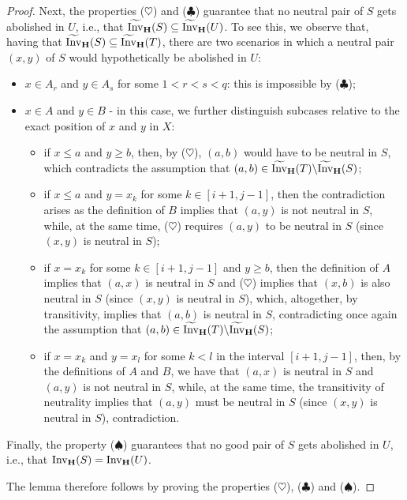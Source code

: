 \documentclass[10pt,a4paper]{amsart}
\newcommand{\Invt}{\widetilde{\mathrm{Inv}}}
\newcommand{\Inv}{{\mathrm{Inv}}}
\begin{document}
\begin{proof}
 Next, the properties ($\heartsuit$) and ($\clubsuit$) guarantee that no neutral pair of $S$ gets abolished in $U$, i.e., that $\Invt_{\bf H}(S)\subseteq\Invt_{\bf H}(U)$. To see this, we observe that, having that $\Invt_{\bf H}(S)\subseteq\Invt_{\bf H}(T)$, there are two scenarios in which a neutral pair $(x,y)$ of $S$ would hypothetically be abolished in $U$:
\begin{itemize}
\item $x\in A_r$ and $y\in A_s$ for some $1<r<s<q$: this is impossible by ($\clubsuit$);
\item $x\in A$ and $y\in B$ - in this case, we further distinguish subcases relative to the exact position of $x$ and $y$ in $X$:
\begin{itemize}
\item if $x\leq a$ and $y\geq b$, then, by ($\heartsuit$), $(a,b)$ would have to be neutral in $S$, which contradicts the assumption that $(a,b)\in \Invt_{\bf H}(T)\backslash \Invt_{\bf H}(S)$;
\item if $x\leq a$ and $y=x_k$ for some $k\in[i+1,j-1]$, then the contradiction arises as the definition of $B$ implies that $(a,y)$ is not neutral in $S$, while, at the same time, ($\heartsuit$) requires $(a,y)$ to be neutral in $S$ (since $(x,y)$ is neutral in $S$);
\item if $x=x_k$ for some $k\in[i+1,j-1]$ and $y\geq b$, then the definition of $A$ implies that $(a,x)$ is neutral in $S$ and ($\heartsuit$) implies that $(x,b)$ is also neutral in $S$ (since $(x,y)$ is neutral in $S$), which, altogether, by transitivity, implies that $(a,b)$ is neutral in $S$, contradicting once again the assumption that $(a,b)\in \Invt_{\bf H}(T)\backslash \Invt_{\bf H}(S)$;
\item if $x=x_k$ and $y=x_l$ for some $k<l$ in the interval $[i+1,j-1]$, then, by the definitions of $A$ and $B$, we have that $(a,x)$ is neutral in $S$ and $(a,y)$ is not neutral in $S$, while, at the same time, the transitivity of neutrality implies that $(a,y)$ must be neutral in $S$ (since $(x,y)$ is neutral in $S$), contradiction. 
\end{itemize} 
\end{itemize}

 Finally, the property ($\spadesuit$) guarantees that no good pair of $S$ gets abolished in $U$, i.e., that $\Inv_{\bf H}(S)=\Inv_{\bf H}(U)$. 

\smallskip

 The lemma therefore follows by proving the properties ($\heartsuit$), ($\clubsuit$) and ($\spadesuit$). 
\smallskip


\end{proof}
\end{document}
